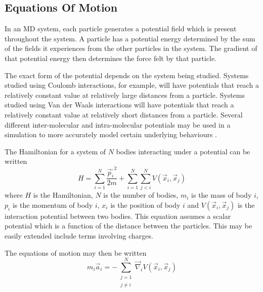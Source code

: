 \subsection{Equations Of Motion}

%
In an MD system, each particle generates a potential field
which is present throughout the system.
%
A particle has a potential energy determined by the sum
of the fields it experiences from the other particles in the system.
%
The gradient of that potential energy then determines
the force felt by that particle.

%
The exact form of the potential depends on the system being studied.
%
Systems studied using Coulomb interactions, for example,
will have potentials that reach a relatively constant value at
relatively large distances from a particle.
%
Systems studied using Van der Waals interactions will have
potentials that reach a relatively constant value at
relatively short distances from a particle.
%
Several different inter-molecular and intra-molecular potentials may be used
in a simulation to more accurately model certain underlying behaviours
\cite{smith1996dlpoly2}.


%
The Hamiltonian for a system of $N$ bodies
interacting under a \twobody{} potential can be written
\begin{equation}
    H = \sum_{i=1}^N \frac{\vec{p}_i^{,2}}{2 m}
        + \sum_{i=1}^N \sum_{j<i}^N V(\vec{x}_i, \vec{x}_j)
\end  {equation}
where $H$ is the Hamiltonian,
$N$ is the number of bodies,
$m_i$ is the mass of body $i$,
$p_i$ is the momentum of body $i$,
$x_i$ is the position of body $i$ and
$V(\vec{x}_i, \vec{x}_j)$ is the \twobody{} interaction potential
between two bodies.
%
This equation assumes a scalar potential which is
a function of the distance between the particles.
%
This may be easily extended include terms involving charges.

The equations of motion may then be written
\begin{equation}
    m_i \vec{a}_i = -\sum_{\substack{j=1\\j\ne{}i}}^N
                    \vec{\nabla}_i V(\vec{x}_i, \vec{x}_j)
\end  {equation}


